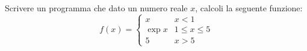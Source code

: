 \begin{Exercise}[label={ex:funzione_a_tratti}]
  Scrivere un programma che dato un numero reale $x$, calcoli la seguente funzione:
  \begin{equation*}
  	f(x) = \left\{ \begin{array}{lr}
  										x & x < 1\\
  										\exp{x} & 1 \leq x \leq 5\\
  										5 & x > 5
  			\end{array}\right.
  \end{equation*}
\end{Exercise}

\begin{Answer}[ref={ex:funzione_a_tratti}]
  
\end{Answer}